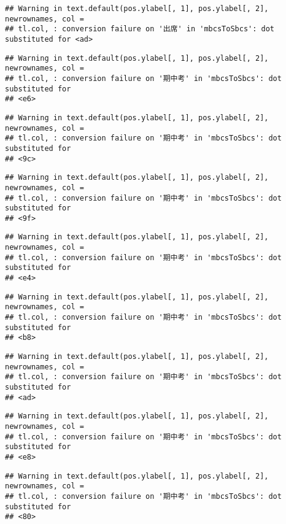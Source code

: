 \documentclass[
]{book}
\begin{document}
\begin{verbatim}
## Warning in text.default(pos.ylabel[, 1], pos.ylabel[, 2], newrownames, col =
## tl.col, : conversion failure on '出席' in 'mbcsToSbcs': dot substituted for <ad>
\end{verbatim}

\begin{verbatim}
## Warning in text.default(pos.ylabel[, 1], pos.ylabel[, 2], newrownames, col =
## tl.col, : conversion failure on '期中考' in 'mbcsToSbcs': dot substituted for
## <e6>
\end{verbatim}

\begin{verbatim}
## Warning in text.default(pos.ylabel[, 1], pos.ylabel[, 2], newrownames, col =
## tl.col, : conversion failure on '期中考' in 'mbcsToSbcs': dot substituted for
## <9c>
\end{verbatim}

\begin{verbatim}
## Warning in text.default(pos.ylabel[, 1], pos.ylabel[, 2], newrownames, col =
## tl.col, : conversion failure on '期中考' in 'mbcsToSbcs': dot substituted for
## <9f>
\end{verbatim}

\begin{verbatim}
## Warning in text.default(pos.ylabel[, 1], pos.ylabel[, 2], newrownames, col =
## tl.col, : conversion failure on '期中考' in 'mbcsToSbcs': dot substituted for
## <e4>
\end{verbatim}

\begin{verbatim}
## Warning in text.default(pos.ylabel[, 1], pos.ylabel[, 2], newrownames, col =
## tl.col, : conversion failure on '期中考' in 'mbcsToSbcs': dot substituted for
## <b8>
\end{verbatim}

\begin{verbatim}
## Warning in text.default(pos.ylabel[, 1], pos.ylabel[, 2], newrownames, col =
## tl.col, : conversion failure on '期中考' in 'mbcsToSbcs': dot substituted for
## <ad>
\end{verbatim}

\begin{verbatim}
## Warning in text.default(pos.ylabel[, 1], pos.ylabel[, 2], newrownames, col =
## tl.col, : conversion failure on '期中考' in 'mbcsToSbcs': dot substituted for
## <e8>
\end{verbatim}

\begin{verbatim}
## Warning in text.default(pos.ylabel[, 1], pos.ylabel[, 2], newrownames, col =
## tl.col, : conversion failure on '期中考' in 'mbcsToSbcs': dot substituted for
## <80>
\end{verbatim}
\end{document}
